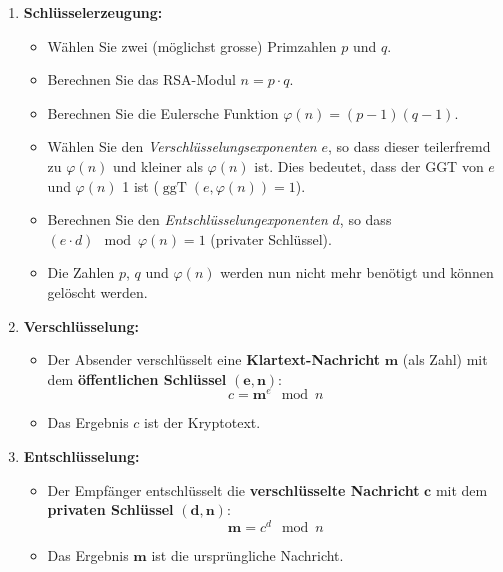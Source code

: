 	\begin{myprocedure}

		\begin{enumerate}
			\item \textbf{Schlüsselerzeugung:}
				\begin{itemize}
					\item Wählen Sie zwei (möglichst grosse) Primzahlen \( p \) und \( q \).
					\item Berechnen Sie das RSA-Modul \( n = p \cdot q \).
					\item Berechnen Sie die Eulersche Funktion \( \varphi(n) = (p-1)(q-1) \).
					\item Wählen Sie den \textit{Verschlüsselungsexponenten} \( e \), so dass dieser teilerfremd zu \( \varphi(n) \) und kleiner als $\varphi(n)$ ist. Dies bedeutet, dass der GGT von $e$ und $\varphi(n)$ 1 ist ($\operatorname{ggT}(e, \varphi(n)) = 1$).
					\item Berechnen Sie den \textit{Entschlüsselungexponenten} \( d \), so dass \( (e \cdot d) \mod \varphi(n) = 1  \) (privater Schlüssel). 
					\item Die Zahlen $p$, $q$ und $\varphi(n)$ werden nun nicht mehr benötigt und können gelöscht werden.
				\end{itemize}
			\item \textbf{Verschlüsselung:}
				\begin{itemize}
					\item Der Absender verschlüsselt eine \textbf{Klartext-Nachricht} \( \mathbf{m} \) (als Zahl) mit dem \textbf{öffentlichen Schlüssel} \( \mathbf{(e, n)} \):
							\[
								c = \mathbf{m}^e \mod n
							\]
					\item Das Ergebnis \( c \) ist der Kryptotext.
				\end{itemize}
			\item \textbf{Entschlüsselung:}
				\begin{itemize}
					\item Der Empfänger entschlüsselt die \textbf{verschlüsselte Nachricht} \( \mathbf{c} \) mit dem \textbf{privaten Schlüssel} \( \mathbf{(d, n)} \):
							\[
								\mathbf{m} = c^d \mod n
							\]
					\item Das Ergebnis \( \mathbf{m} \) ist die ursprüngliche Nachricht.
				\end{itemize}
		\end{enumerate}
	\end{myprocedure}


